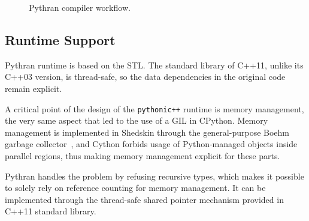 \documentclass{llncs}
\begin{document}
\begin{figure}

\centering
{}
\caption{Pythran compiler workflow.}
\label{fig:pythran-compiler}
\end{figure}

\subsection{Runtime Support}

Pythran runtime is based on the STL. The standard library of C++11, unlike its
C++03 version, is thread-safe, so the data dependencies in the original code
remain explicit.

A critical point of the design of the \texttt{pythonic++} runtime is memory
management, the very same aspect that led to the use of a GIL in CPython.
Memory management is implemented in Shedskin through the general-purpose Boehm
garbage collector~\cite{boehm1991}, and Cython forbids usage of Python-managed
objects inside parallel regions, thus making memory management explicit for
these parts.

Pythran handles the problem by refusing recursive types, which makes it possible
to solely rely on reference counting for memory management. It can be
implemented through the thread-safe shared pointer mechanism provided in C++11
standard library.
\end{document}
